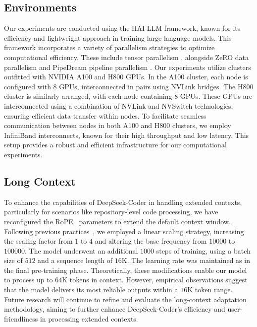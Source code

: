 \subsection{Environments} Our experiments are conducted using the HAI-LLM \citep{haillm} framework, known for its efficiency and lightweight approach in training large language models. This framework incorporates a variety of parallelism strategies to optimize computational efficiency. These include tensor parallelism \citep{korthikanti2023reducing}, alongside ZeRO data parallelism \citep{rajbhandari2020zero} and PipeDream pipeline parallelism \citep{narayanan2019pipedream}. Our experiments utilize clusters outfitted with NVIDIA A100 and H800 GPUs. In the A100 cluster, each node is configured with 8 GPUs, interconnected in pairs using NVLink bridges. The H800 cluster is similarly arranged, with each node containing 8 GPUs. These GPUs are interconnected using a combination of NVLink and NVSwitch technologies, ensuring efficient data transfer within nodes. To facilitate seamless communication between nodes in both A100 and H800 clusters, we employ InfiniBand interconnects, known for their high throughput and low latency. This setup provides a robust and efficient infrastructure for our computational experiments.

\subsection{Long Context}

To enhance the capabilities of DeepSeek-Coder in handling extended contexts, particularly for scenarios like repository-level code processing, we have reconfigured the RoPE~\citep{su2023roformer} parameters to extend the default context window. Following previous practices~\citep{chen2023extending, superhot}, we employed a linear scaling strategy, increasing the scaling factor from $1$ to $4$ and altering the base frequency from $10000$ to $100000$. The model underwent an additional $1000$ steps of training, using a batch size of $512$ and a sequence length of $16$K. The learning rate was maintained as in the final pre-training phase. Theoretically, these modifications enable our model to process up to $64$K tokens in context. However, empirical observations suggest that the model delivers its most reliable outputs within a $16$K token range. Future research will continue to refine and evaluate the long-context adaptation methodology, aiming to further enhance DeepSeek-Coder's efficiency and user-friendliness in processing extended contexts.

